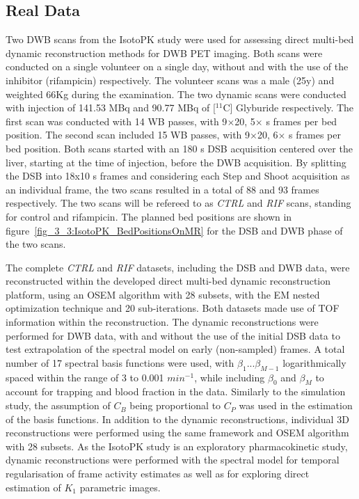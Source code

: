 \subsection{Real Data}
Two DWB scans from the IsotoPK study were used for assessing direct multi-bed dynamic reconstruction methods for DWB PET imaging. Both scans were conducted on a single volunteer on a single day, without and with the use of the inhibitor (rifampicin) respectively. The volunteer scans was a male (25y) and weighted 66Kg during the examination. The two dynamic scans were conducted with injection of 141.53 MBq and 90.77 MBq of [$^{11}$C] Glyburide respectively. The first scan was conducted with 14 WB passes, with 9$\times$20, 5$\times$ s frames per bed position. The second scan included 15 WB passes, with 9$\times$20, 6$\times$ s frames per bed position. Both scans started with an 180 s DSB acquisition centered over the liver, starting at the time of injection, before the DWB acquisition. By splitting the DSB into 18x10 s frames and considering each Step and Shoot acquisition as an individual frame, the two scans resulted in a total of 88 and 93 frames respectively. 
The two scans will be refereed to as \textit{CTRL} and \textit{RIF} scans, standing for control and rifampicin. 
The planned bed positions are shown in figure~\ref{fig_3_3:IsotoPK_BedPositionsOnMR} for the DSB and DWB phase of the two scans. 

The complete \textit{CTRL} and \textit{RIF} datasets, including the DSB and DWB data, were reconstructed within the developed direct multi-bed dynamic reconstruction platform, using an OSEM algorithm with 28 subsets, with the EM nested optimization technique and 20 sub-iterations. Both datasets made use of TOF information within the reconstruction. The dynamic reconstructions were performed for DWB data, with and without the use of the initial DSB data to test extrapolation of the spectral model on early (non-sampled) frames. 
A total number of 17 spectral basis functions were used, with $\beta_1 ... \beta_{M-1}$ logarithmically spaced within the range of 3 to 0.001 $min^{-1}$, while including $\beta_0$ and $\beta_{M}$ to account for trapping and blood fraction in the data. Similarly to the simulation study, the assumption of $C_{B}$ being proportional to $C_{P}$ was used in the estimation of the basis functions.
In addition to the dynamic reconstructions, individual 3D reconstructions were performed using the same framework and OSEM algorithm with 28 subsets. As the IsotoPK study is an exploratory pharmacokinetic study, dynamic reconstructions were performed with the spectral model for temporal regularisation of frame activity estimates as well as for exploring direct estimation of $K_1$ parametric images. 

